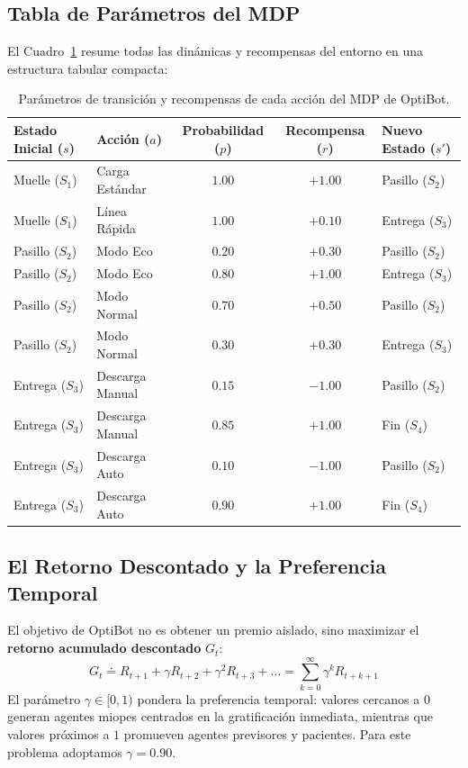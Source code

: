 \subsection{Tabla de Parámetros del MDP}
El Cuadro~\ref{tab:mdp_parameters} resume todas las dinámicas y recompensas del entorno en una estructura tabular compacta:


\begin{table}[!htb]
\centering
\small
\begin{tabular}{llccl}
\toprule
\textbf{Estado Inicial ($s$)} & \textbf{Acción ($a$)} & \textbf{Probabilidad ($p$)} & \textbf{Recompensa ($r$)} & \textbf{Nuevo Estado ($s'$)} \\
\midrule
Muelle ($S_1$) & Carga Estándar & $1.00$ & $+1.00$ & Pasillo ($S_2$) \\
Muelle ($S_1$) & Línea Rápida   & $1.00$ & $+0.10$ & Entrega ($S_3$) \\
\midrule
Pasillo ($S_2$) & Modo Eco    & $0.20$ & $+0.30$ & Pasillo ($S_2$) \\
Pasillo ($S_2$) & Modo Eco    & $0.80$ & $+1.00$ & Entrega ($S_3$) \\
Pasillo ($S_2$) & Modo Normal & $0.70$ & $+0.50$ & Pasillo ($S_2$) \\
Pasillo ($S_2$) & Modo Normal & $0.30$ & $+0.30$ & Entrega ($S_3$) \\
\midrule
Entrega ($S_3$) & Descarga Manual & $0.15$ & $-1.00$ & Pasillo ($S_2$) \\
Entrega ($S_3$) & Descarga Manual & $0.85$ & $+1.00$ & Fin ($S_4$) \\
Entrega ($S_3$) & Descarga Auto   & $0.10$ & $-1.00$ & Pasillo ($S_2$) \\
Entrega ($S_3$) & Descarga Auto   & $0.90$ & $+1.00$ & Fin ($S_4$) \\
\bottomrule
\end{tabular}
\caption{Parámetros de transición y recompensas de cada acción del MDP de OptiBot.}
\label{tab:mdp_parameters}
\end{table}

\subsection{El Retorno Descontado y la Preferencia Temporal}
El objetivo de OptiBot no es obtener un premio aislado, sino maximizar el \textbf{retorno acumulado descontado} $G_t$:
\begin{equation}
  G_t \doteq R_{t+1} + \gamma R_{t+2} + \gamma^2 R_{t+3} + \dots = \sum_{k=0}^{\infty} \gamma^k R_{t+k+1}
\end{equation}
El parámetro $\gamma \in [0, 1)$ pondera la preferencia temporal: valores cercanos a $0$ generan agentes miopes centrados en la gratificación inmediata, mientras que valores próximos a $1$ promueven agentes previsores y pacientes. Para este problema adoptamos $\gamma = 0.90$.

